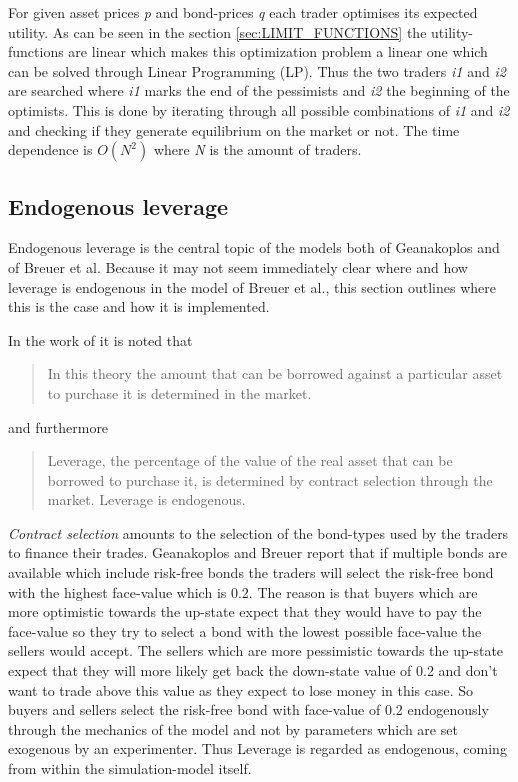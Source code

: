 \documentclass[../Bachelorarbeit.tex]{subfiles}
\begin{document}
\medskip

For given asset prices \textit{p} and bond-prices \textit{q} each trader optimises its expected utility. As can be seen in the section \ref{sec:LIMIT_FUNCTIONS} the utility-functions are linear which makes this optimization problem a linear one which can be solved through Linear Programming (LP). Thus the two traders \textit{i1} and \textit{i2} are searched where \textit{i1} marks the end of the pessimists and \textit{i2} the beginning of the optimists. This is done by iterating through all possible combinations of \textit{i1} and \textit{i2} and checking if they generate equilibrium on the market or not. The time dependence is $O(N^2)$ where \textit{N} is the amount of traders. 

\subsection{Endogenous leverage}
Endogenous leverage is the central topic of the models both of Geanakoplos and of Breuer et al. Because it may not seem immediately clear where and how leverage is endogenous in the model of Breuer et al., this section outlines where this is the case and how it is implemented. 

\medskip
In the work of \cite{Breuer2015} it is noted that 
\begin{quote}
In this theory the amount that can be borrowed against a particular asset to purchase it is determined in the market.
\end{quote}

and furthermore

\begin{quote}
Leverage, the percentage of the value of the real asset that can be borrowed to purchase it, is determined by contract selection through the market. Leverage is endogenous.
\end{quote}

\textit{Contract selection} amounts to the selection of the bond-types used by the traders to finance their trades. Geanakoplos and Breuer report that if multiple bonds are available which include risk-free bonds the traders will select the risk-free bond with the highest face-value which is 0.2. The reason is that buyers which are more optimistic towards the up-state expect that they would have to pay the face-value so they try to select a bond with the lowest possible face-value the sellers would accept. The sellers which are more pessimistic towards the up-state expect that they will more likely get back the down-state value of 0.2 and don't want to trade above this value as they expect to lose money in this case. So buyers and sellers select the risk-free bond with face-value of 0.2 endogenously through the mechanics of the model and not by parameters which are set exogenous by an experimenter. Thus Leverage is regarded as endogenous, coming from within the simulation-model itself.
\end{document}
